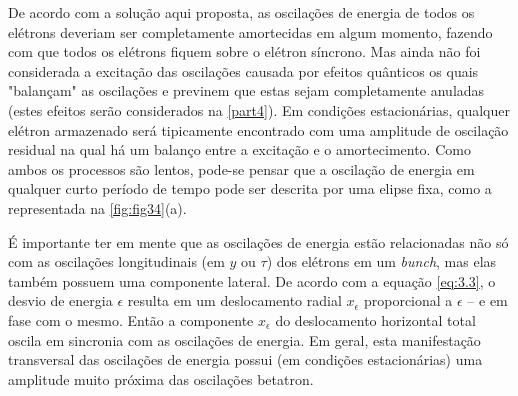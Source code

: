 De acordo com a solução aqui proposta, as oscilações de energia de todos os elétrons deveriam ser completamente amortecidas em algum momento, fazendo com que todos os elétrons fiquem sobre o elétron síncrono. Mas ainda não foi considerada a excitação das oscilações causada por efeitos quânticos os quais "balançam" as oscilações e previnem que estas sejam completamente anuladas (estes efeitos serão considerados na \autoref{part4}). Em condições estacionárias, qualquer elétron armazenado será tipicamente encontrado com uma amplitude de oscilação residual na qual há um balanço entre a excitação e o amortecimento. Como ambos os processos são lentos, pode-se pensar que a oscilação de energia em qualquer curto período de tempo pode ser descrita por uma elipse fixa, como a representada na \autoref{fig:fig34}(a).

É importante ter em mente que as oscilações de energia estão relacionadas não só com as oscilações longitudinais (em $y$ ou $\tau$) dos elétrons em um \textit{bunch}, mas elas também possuem uma componente lateral. De acordo com a equação \eqref{eq:3.3}, o desvio de energia $\epsilon$ resulta em um deslocamento radial $x_\epsilon$ proporcional a $\epsilon$ -- e em fase com o mesmo. Então a componente $x_\epsilon$ do deslocamento horizontal total oscila em sincronia com as oscilações de energia. Em geral, esta manifestação transversal das oscilações de energia possui (em condições estacionárias) uma amplitude muito próxima das oscilações betatron.